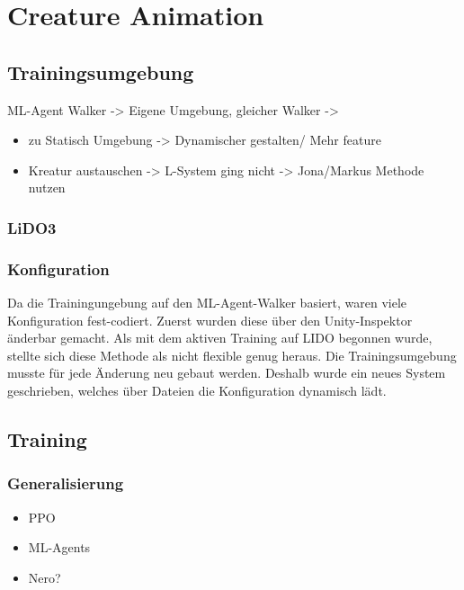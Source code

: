 \section{Creature Animation}

\subsection{Trainingsumgebung}
ML-Agent Walker -> Eigene Umgebung, gleicher Walker -> 
\begin{itemize}
	\item zu Statisch  Umgebung -> Dynamischer gestalten/ Mehr feature
	\item Kreatur austauschen -> L-System ging nicht -> Jona/Markus Methode nutzen
\end{itemize}

\subsubsection{LiDO3}
\subsubsection{Konfiguration}
Da die Trainingungebung auf den ML-Agent-Walker basiert, waren viele Konfiguration fest-codiert. Zuerst wurden diese über den Unity-Inspektor änderbar gemacht. Als mit dem aktiven Training auf LIDO begonnen wurde, stellte sich diese Methode als nicht flexible genug heraus. Die Trainingsumgebung musste für jede Änderung neu gebaut werden. Deshalb wurde ein neues System geschrieben, welches über Dateien die Konfiguration dynamisch lädt.

\subsection{Training}
\subsubsection{Generalisierung}
\begin{itemize}
	\item PPO
	\item ML-Agents
	\item Nero?
\end{itemize}
